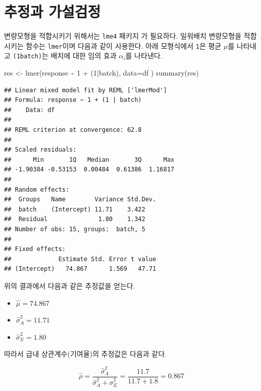 \documentclass[
]{book}
\newenvironment{Shaded}{\begin{snugshade}}{\end{snugshade}}
\newcommand{\AttributeTok}[1]{\textcolor[rgb]{0.77,0.63,0.00}{#1}}
\newcommand{\DecValTok}[1]{\textcolor[rgb]{0.00,0.00,0.81}{#1}}
\newcommand{\FunctionTok}[1]{\textcolor[rgb]{0.00,0.00,0.00}{#1}}
\newcommand{\NormalTok}[1]{#1}
\newcommand{\OtherTok}[1]{\textcolor[rgb]{0.56,0.35,0.01}{#1}}
\newcommand{\SpecialCharTok}[1]{\textcolor[rgb]{0.00,0.00,0.00}{#1}}
\providecommand{\tightlist}{%
  \setlength{\itemsep}{0pt}\setlength{\parskip}{0pt}}
\theoremstyle{definition}
\theoremstyle{definition}
\theoremstyle{definition}
\theoremstyle{remark}
\begin{document}
\hypertarget{uxcd94uxc815uxacfc-uxac00uxc124uxac80uxc815}{%
\section{추정과 가설검정}\label{uxcd94uxc815uxacfc-uxac00uxc124uxac80uxc815}}

변량모형을 적합시키기 위해서는 \texttt{lme4} 패키지 가 필요하다. 일워배치 변량모형을 적합시키는 함수는
\texttt{lmer}이며 다음과 같이 사용한다. 아래 모형식에서 \texttt{1}은 평균 \(\mu\)를 나타내고 \texttt{(1\textbar{}batch)}는 배치에 대한 임의 효과 \(\alpha_i\)를 나타낸다.

\begin{Shaded}
\begin{Highlighting}[]
\NormalTok{res }\OtherTok{\textless{}{-}} \FunctionTok{lmer}\NormalTok{(response }\SpecialCharTok{\textasciitilde{}} \DecValTok{1} \SpecialCharTok{+}\NormalTok{ (}\DecValTok{1}\SpecialCharTok{|}\NormalTok{batch), }\AttributeTok{data=}\NormalTok{df ) }
\FunctionTok{summary}\NormalTok{(res)}
\end{Highlighting}
\end{Shaded}

\begin{verbatim}
## Linear mixed model fit by REML ['lmerMod']
## Formula: response ~ 1 + (1 | batch)
##    Data: df
## 
## REML criterion at convergence: 62.8
## 
## Scaled residuals: 
##      Min       1Q   Median       3Q      Max 
## -1.90384 -0.53153  0.00484  0.61386  1.16817 
## 
## Random effects:
##  Groups   Name        Variance Std.Dev.
##  batch    (Intercept) 11.71    3.422   
##  Residual              1.80    1.342   
## Number of obs: 15, groups:  batch, 5
## 
## Fixed effects:
##             Estimate Std. Error t value
## (Intercept)   74.867      1.569   47.71
\end{verbatim}

위의 결과에서 다음과 같은 추정값을 얻는다.

\begin{itemize}
\tightlist
\item
  \(\hat \mu = 74.867\)
\item
  \(\hat \sigma^2_A = 11.71\)
\item
  \(\hat \sigma_E^2 = 1.80\)
\end{itemize}

따라서 급내 상관계수(기여율)의 추정값은 다음과 같다.

\[ \hat \rho = \frac{\hat \sigma^2_A }{\hat \sigma^2_A + \hat \sigma^2_E }
= \frac{11.7}{11.7 + 1.8} = 0.867 \]
\end{document}
